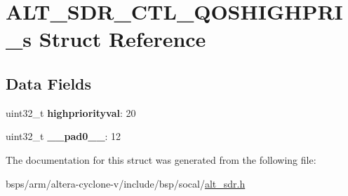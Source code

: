 \hypertarget{structALT__SDR__CTL__QOSHIGHPRI__s}{}\section{A\+L\+T\+\_\+\+S\+D\+R\+\_\+\+C\+T\+L\+\_\+\+Q\+O\+S\+H\+I\+G\+H\+P\+R\+I\+\_\+s Struct Reference}
\label{structALT__SDR__CTL__QOSHIGHPRI__s}
\subsection*{Data Fields}
\begin{DoxyCompactItemize}
\item 
\mbox{\label{structALT__SDR__CTL__QOSHIGHPRI__s_a9d648e0ce703960d5aece2b305f4bc18}} 
uint32\+\_\+t {\bfseries highpriorityval}\+: 20
\item 
\mbox{\label{structALT__SDR__CTL__QOSHIGHPRI__s_a1443f26107834816b019306328617cea}} 
uint32\+\_\+t {\bfseries \+\_\+\+\_\+pad0\+\_\+\+\_\+}\+: 12
\end{DoxyCompactItemize}


The documentation for this struct was generated from the following file\+:\begin{DoxyCompactItemize}
\item 
bsps/arm/altera-\/cyclone-\/v/include/bsp/socal/\mbox{\hyperlink{alt__sdr_8h}{alt\+\_\+sdr.\+h}}\end{DoxyCompactItemize}
